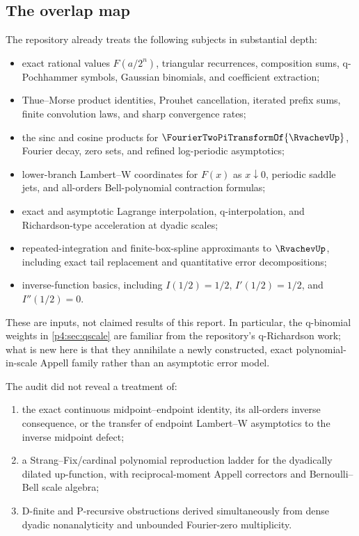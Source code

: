 \documentclass[11pt]{article}
\numberwithin{equation}{section}
\theoremstyle{definition}
\theoremstyle{remark}
\begin{document}
\subsection{The overlap map}
The repository already treats the following subjects in substantial depth:
\begin{itemize}
\item exact rational values $F(a/2^n)$, triangular recurrences, composition sums, q-Pochhammer symbols, Gaussian binomials, and coefficient extraction;
\item Thue--Morse product identities, Prouhet cancellation, iterated prefix sums, finite convolution laws, and sharp convergence rates;
\item the sinc and cosine products for $\FourierTwoPiTransformOf{\RvachevUp}$, Fourier decay, zero sets, and refined log-periodic asymptotics;
\item lower-branch Lambert--W coordinates for $F(x)$ as $x\downarrow0$, periodic saddle jets, and all-orders Bell-polynomial contraction formulas;
\item exact and asymptotic Lagrange interpolation, q-interpolation, and Richardson-type acceleration at dyadic scales;
\item repeated-integration and finite-box-spline approximants to $\RvachevUp$, including exact tail replacement and quantitative error decompositions;
\item inverse-function basics, including $I(1/2)=1/2$, $I'(1/2)=1/2$, and $I''(1/2)=0$.
\end{itemize}
These are inputs, not claimed results of this report.  In particular, the q-binomial weights in \cref{p4:sec:qscale} are familiar from the repository's q-Richardson work; what is new here is that they annihilate a newly constructed, exact polynomial-in-scale Appell family rather than an asymptotic error model.

\begin{mainpointbox}[title=Three principal corpus gaps]
The audit did not reveal a treatment of:
\begin{enumerate}
\item the exact continuous midpoint--endpoint identity, its all-orders inverse consequence, or the transfer of endpoint Lambert--W asymptotics to the inverse midpoint defect;
\item a Strang--Fix/cardinal polynomial reproduction ladder for the dyadically dilated up-function, with reciprocal-moment Appell correctors and Bernoulli--Bell scale algebra;
\item D-finite and P-recursive obstructions derived simultaneously from dense dyadic nonanalyticity and unbounded Fourier-zero multiplicity.
\end{enumerate}
\end{mainpointbox}
\end{document}
